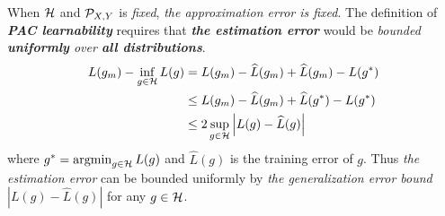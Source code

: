 \documentclass[11pt]{article}
\begin{document}
\begin{itemize}
\begin{remark}
When ${\mathcal H}$ and ${\mathcal P}_{X, Y}$ is \emph{fixed}, \emph{the approximation error is fixed}. The definition of \emph{\textbf{PAC learnability}} requires that \emph{\textbf{the estimation error}} would be \emph{bounded} \emph{\textbf{uniformly} over \textbf{all distributions}}.
\begin{align*}
L(g_m) - \inf_{g \in {\mathcal H}}L(g) &= L(g_m) - \widehat{L}(g_m) + \widehat{L}(g_m) - L(g^{*})\\
&\le  L(g_m) - \widehat{L}(g_m) +\widehat{L}(g^{*}) - L(g^{*})\\
&\le  2 \sup_{g\in {\mathcal H}}\left\lvert L(g) - \widehat{L}(g) \right\rvert
\end{align*} where $g^{*} = \operatorname{argmin}_{g\in {\mathcal H}}L(g)$ and $\widehat{L}(g)$ is the training error of $g$. Thus \emph{the estimation error} can be bounded uniformly by \emph{the generalization error bound} $|L(g) - \widehat{L}(g)|$ for any $g \in {\mathcal H}$.
\end{remark} 
\end{itemize}
\end{document}
